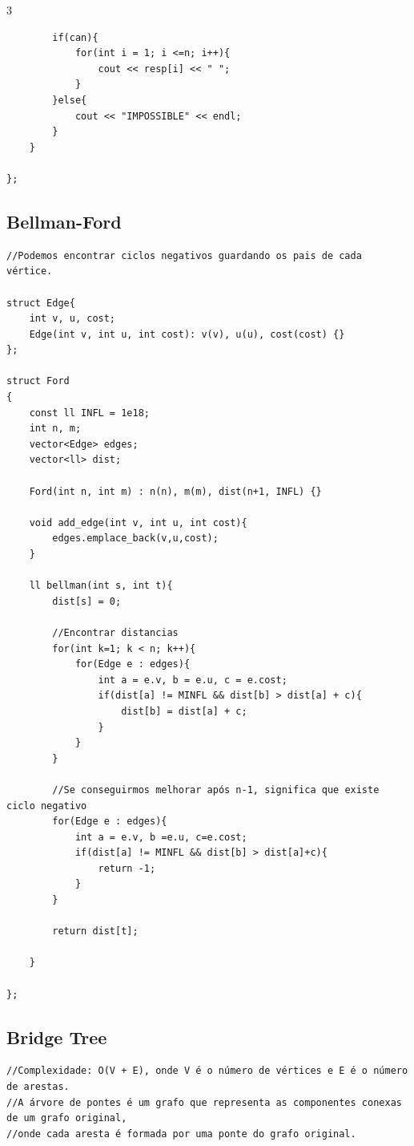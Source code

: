 \documentclass[9pt, a4paper, notitlepage]{extreport}
\begin{document}
\begin{multicols}{3}
\begin{verbatim}
        if(can){
            for(int i = 1; i <=n; i++){
                cout << resp[i] << " ";
            }
        }else{
            cout << "IMPOSSIBLE" << endl;
        }
    }

};
\end{verbatim}

\subsection{Bellman-Ford}
\begin{verbatim}
//Podemos encontrar ciclos negativos guardando os pais de cada vértice.

struct Edge{
    int v, u, cost;
    Edge(int v, int u, int cost): v(v), u(u), cost(cost) {}
};

struct Ford
{   
    const ll INFL = 1e18;
    int n, m;
    vector<Edge> edges;
    vector<ll> dist;

    Ford(int n, int m) : n(n), m(m), dist(n+1, INFL) {}

    void add_edge(int v, int u, int cost){
        edges.emplace_back(v,u,cost);
    }

    ll bellman(int s, int t){
        dist[s] = 0;

        //Encontrar distancias
        for(int k=1; k < n; k++){
            for(Edge e : edges){
                int a = e.v, b = e.u, c = e.cost;
                if(dist[a] != MINFL && dist[b] > dist[a] + c){
                    dist[b] = dist[a] + c;
                }
            }
        }

        //Se conseguirmos melhorar após n-1, significa que existe ciclo negativo
        for(Edge e : edges){
            int a = e.v, b =e.u, c=e.cost;
            if(dist[a] != MINFL && dist[b] > dist[a]+c){
                return -1;
            }
        }

        return dist[t];
        
    }

};
\end{verbatim}

\subsection{Bridge Tree}
\begin{verbatim}
//Complexidade: O(V + E), onde V é o número de vértices e E é o número de arestas.
//A árvore de pontes é um grafo que representa as componentes conexas de um grafo original,
//onde cada aresta é formada por uma ponte do grafo original.


\end{verbatim}
\end{multicols}
\end{document}
